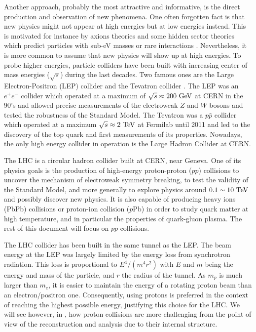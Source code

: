     Another approach, probably the most attractive and informative, is the direct production and observation of
    new phenomena. One often forgotten fact is that new physics might not appear at high
    energies but at low energies instead. This is motivated for instance by axions
    theories and some hidden sector theories which predict particles with sub-eV masses
    or rare interactions \cite{PolarizedHelium, CavityForHiddenPhotons}. Nevertheless, it
    is more common to assume that new physics will show up at high energies. To probe
    higher energies, particle colliders have been
    built with increasing center of mass energies ($\sqrt{s}$) during the last decades.
    Two famous ones are the Large Electron-Positron (LEP) collider \cite{LEP} and the
    Tevatron collider \cite{Tevatron}. The
    LEP was an $e^+e^-$ collider which operated at a maximum of $\sqrt{s} \approx 200~\text{GeV}$
    at CERN in the 90's and allowed precise measurements of the electroweak $Z$ and $W$
    bosons and tested the robustness of the Standard Model. The Tevatron was a $p\bar{p}$
    collider which operated at a maximum $\sqrt{s} \approx 2~\text{TeV}$ at Fermilab until 2011
    and led to the discovery of the top quark and first measurements of its properties.
    Nowadays, the only high energy collider in operation is the Large Hadron Collider
    at CERN.

    The LHC \cite{LHC} is a circular hadron collider built at CERN, near Geneva. One of its physics
    goals is the production of high-energy proton-proton ($pp$) collisions to uncover the mechanism
    of electroweak symmetry breaking, to test the validity of the Standard Model, and more
    generally to explore physics around $0.1 \sim 10~\text{TeV}$ and possibly discover new
    physics. It is also capable of producing heavy ions (PbPb) collisions or proton-ion
    collision ($p$Pb) in order to study quark matter at high temperature,
    and in particular the properties of quark-gluon plasma. The rest of this document will
    focus on $pp$ collisions.

    The LHC collider has been built in the same tunnel as the LEP. The beam energy at
    the LEP was largely limited by the energy loss from synchrotron radiation. This loss
    is proportional to $E^4 / (m^{4} r^{2})$ with $E$ and $m$ being the energy and mass of the
    particle, and $r$ the radius of the tunnel. As $m_p$ is much larger than $m_e$, it is
    easier to maintain the energy of a rotating proton beam than an electron/positron one.
    Consequently, using protons is preferred in the context of reaching the highest possible
    energy, justifying this choice for the LHC. We will see however, in
    , how proton collisions are more challenging
    from the point of view of the reconstruction and analysis due to their internal structure.

